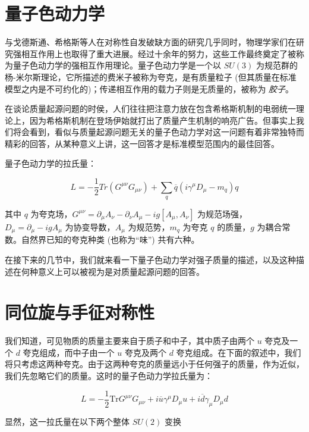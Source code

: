 \section{量子色动力学}

与戈德斯通、希格斯等人在对称性自发破缺方面的研究几乎同时，物理学家们在研究强相互作用上也取得了重大进展。经过十余年的努力，这些工作最终奠定了被称为量子色动力学的强相互作用理论。量子色动力学是一个以 $SU(3)$ 为规范群的杨-米尔斯理论，它所描述的费米子被称为夸克，是有质量粒子 (但其质量在标准模型之内是不可约化的)；传递相互作用的载力子则是无质量的，被称为 \emph{胶子}。

在谈论质量起源问题的时侯，人们往往把注意力放在包含希格斯机制的电弱统一理论上，因为希格斯机制在登场伊始就打出了质量产生机制的响亮广告。但事实上我们将会看到，看似与质量起源问题无关的量子色动力学对这一问题有着非常独特而精彩的回答，从某种意义上讲，这一回答才是标准模型范围内的最佳回答。

量子色动力学的拉氏量：

\begin{equation}
    L = -\frac{1}{2} Tr(G^{\mu\nu} G_{\mu\nu}) + \sum_q \overline{q}(i\gamma^\mu D_\mu - m_q)q
\end{equation}

\noindent 其中 $q$ 为夸克场，$G^{\mu\nu}=\partial_\mu A_\nu - \partial_\nu A_\mu - i g [A_\mu, A_\nu]$ 为规范场强，$D_\mu=\partial_\mu-i g A_\mu$ 为协变导数，$A_\mu$ 为规范势，$m_q$ 为夸克 $q$ 的质量，$g$ 为耦合常数。自然界已知的夸克种类 (也称为“味”) 共有六种。

在接下来的几节中，我们就来看一下量子色动力学对强子质量的描述，以及这种描述在何种意义上可以被视为是对质量起源问题的回答。

\section{同位旋与手征对称性}

我们知道，可见物质的质量主要来自于质子和中子，其中质子由两个 $u$ 夸克及一个 $d$ 夸克组成，而中子由一个 $u$ 夸克及两个 $d$ 夸克组成。在下面的叙述中，我们将只考虑这两种夸克。由于这两种夸克的质量远小于任何强子的质量，作为近似，我们先忽略它们的质量。这时的量子色动力学拉氏量为：

\begin{equation}
    L = -\frac{1}{2} \mathrm{Tr} G^{\mu\nu} G_{\mu\nu} + i \overline{u} \gamma^\mu D_\mu u + i \overline{d} \gamma_\mu D_\mu d
\end{equation}

\noindent 显然，这一拉氏量在以下两个整体 $SU(2)$ 变换

